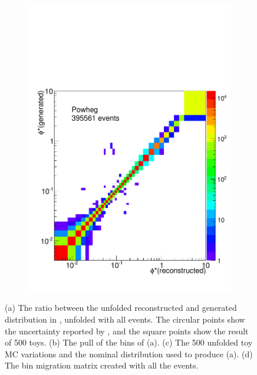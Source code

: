 \begin{figure}[!htbp]
\begin{subfigure}[b]{\SideBySidePlotWidth}
        \includegraphics[width=\textwidth]{figures/BinM_P_ALL.pdf}
        \caption{}
        \label{fig:bin_migration_all}
    \end{subfigure}
    \caption[
        Full uncertainty propegation using all \POWHEG events to unfold
        \MADGRAPH.
    ]{
        (a) The ratio between the unfolded reconstructed and generated \phistar
        distribution in \MADGRAPH, unfolded with all \POWHEG events. The
        circular points show the uncertainty reported by \RooUnfold, and the
        square points show the result of \num{500} toys. (b) The pull of the
        bins of (a). (c) The \num{500} unfolded toy MC variations and the
        nominal distribution used to produce (a). (d) The bin migration matrix
        created with all the \POWHEG events.
    }
\label{fig:full_propegation_unfolding}
\end{figure}

